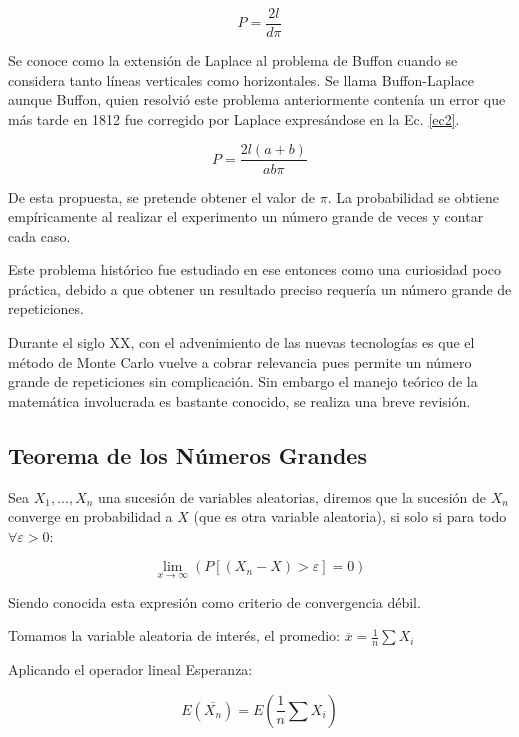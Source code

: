 \documentclass{rbf}
\begin{document}
\begin{equation}\label{ec1}
    P=\frac{2l}{d\pi}
\end{equation}

Se conoce como la extensión de Laplace al problema de Buffon cuando se considera tanto líneas verticales como horizontales. Se llama Buffon-Laplace aunque Buffon, quien resolvió este problema anteriormente contenía un error que más tarde en 1812 fue corregido por Laplace expresándose en la Ec. \ref{ec2}.

\begin{equation}\label{ec2}
    P=\frac{2l(a+b)}{ab\pi}
\end{equation}

De esta propuesta, se pretende obtener el valor de $\pi$. La probabilidad se obtiene empíricamente al realizar el experimento un número grande de veces y contar cada caso.

Este problema histórico fue estudiado en ese entonces como una curiosidad poco práctica, debido a que obtener un resultado preciso requería un número grande de repeticiones. 

Durante el siglo XX, con el advenimiento de las nuevas tecnologías es que el método de Monte Carlo vuelve a cobrar relevancia pues permite un número grande de repeticiones sin complicación. Sin embargo el manejo teórico de la matemática involucrada es bastante conocido, se realiza una breve revisión.

\subsection{Teorema de los Números Grandes}

Sea $X_1,..., X_n$ una sucesión de variables aleatorias, diremos que la sucesión de ${X_n}$ converge en probabilidad a $X$ (que es otra variable aleatoria), si solo si para todo $\forall \varepsilon >0$:

\begin{equation}
   \displaystyle \lim_{x \to \infty}(P[(X_n - X)>\varepsilon]=0)
\end{equation}

Siendo conocida esta expresión como criterio de convergencia débil. 

Tomamos la variable aleatoria de interés, el promedio: $\overline{x}=\frac{1}{n}\sum X_i$

Aplicando el operador lineal Esperanza:

\begin{equation}
  \displaystyle  E(\overline{X_n})=E(\frac{1}{n} \sum X_i)
\end{equation}
\end{document}
